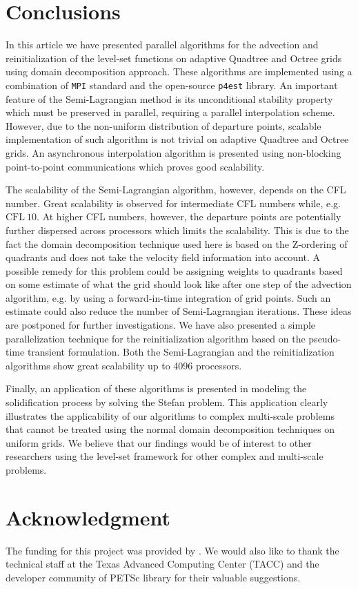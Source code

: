 \section{Conclusions}
In this article we have presented parallel algorithms for the advection and reinitialization of the level-set functions on adaptive Quadtree and Octree grids using domain decomposition approach. These algorithms are implemented using a combination of \texttt{MPI} standard and the open-source \texttt{p4est} library. An important feature of the Semi-Lagrangian method is its unconditional stability property which must be preserved in parallel, requiring a parallel interpolation scheme. However, due to the non-uniform distribution of departure points, scalable implementation of such algorithm is not trivial on adaptive Quadtree and Octree grids. An asynchronous interpolation algorithm is presented using non-blocking point-to-point communications which proves good scalability. 

The scalability of the Semi-Lagrangian algorithm, however, depends on the CFL number. Great scalability is observed for intermediate CFL numbers while, e.g. $\text{CFL}~10$. At higher CFL numbers, however, the departure points are potentially further dispersed across processors which limits the scalability. This is due to the fact the domain decomposition technique used here is based on the Z-ordering of quadrants and does not take the velocity field information into account. A possible remedy for this problem could be assigning weights to quadrants based on some estimate of what the grid should look like after one step of the advection algorithm, e.g. by using a forward-in-time integration of grid points. Such an estimate could also reduce the number of Semi-Lagrangian iterations. These ideas are postponed for further investigations. We have also presented a simple parallelization technique for the reinitialization algorithm based on the pseudo-time transient formulation. Both the Semi-Lagrangian and the reinitialization algorithms show great scalability up to 4096 processors. 

Finally, an application of these algorithms is presented in modeling the solidification process by solving the Stefan problem. This application clearly illustrates the applicability of our algorithms to complex multi-scale problems that cannot be treated using the normal domain decomposition techniques on uniform grids. We believe that our findings would be of interest to other researchers using the level-set framework for other complex and multi-scale problems.

\section*{Acknowledgment} 
The funding for this project was provided by . We would also like to thank the technical staff at the Texas Advanced Computing Center (TACC) and the developer community of PETSc library for their valuable suggestions.
